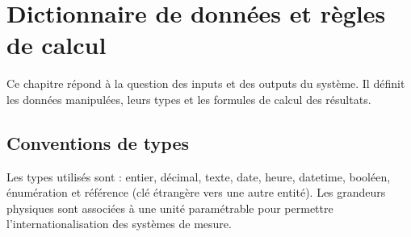 \chapter{Dictionnaire de données et règles de calcul}
Ce chapitre répond à la question des inputs et des outputs du système. Il définit
les données manipulées, leurs types et les formules de calcul des résultats.

\section{Conventions de types}
Les types utilisés sont : entier, décimal, texte, date, heure, datetime, booléen,
énumération et référence (clé étrangère vers une autre entité). Les grandeurs
physiques sont associées à une unité paramétrable pour permettre
l'internationalisation des systèmes de mesure.

